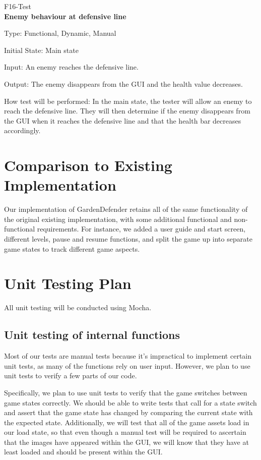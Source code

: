\documentclass[12pt, titlepage]{article}
\begin{document}
\noindent F16-Test \\
\textbf{Enemy behaviour at defensive line}

\noindent Type: Functional, Dynamic, Manual
					
\noindent Initial State: Main state
					
\noindent Input: An enemy reaches the defensive line.
					
\noindent Output: The enemy disappears from the GUI and the health value decreases.
					
\noindent How test will be performed: In the main state, the tester will allow an enemy to reach the defensive line.  They will then determine if the enemy disappears from the GUI when it reaches the defensive line and that the health bar decreases accordingly.

\section{Comparison to Existing Implementation}	

Our implementation of GardenDefender retains all of the same functionality of the original existing implementation, with some additional functional and non-functional requirements.  For instance, we added a user guide and start screen, different levels, pause and resume functions, and split the game up into separate game states to track different game aspects. 
				
\section{Unit Testing Plan}
All unit testing will be conducted using Mocha.
		
\subsection{Unit testing of internal functions}

Most of our tests are manual tests because it's impractical to implement certain unit tests, as many of the functions rely on user input. However, we plan to use unit tests to verify a few parts of our code. 

Specifically, we plan to use unit tests to verify that the game switches between game states correctly. We should be able to write tests that call for a state switch and assert that the game state has changed by comparing the current state with the expected state. Additionally, we will test that all of the game assets load in our load state, so that even though a manual test will be required to ascertain that the images have appeared within the GUI, we will know that they have at least loaded and should be present within the GUI. 
\end{document}
